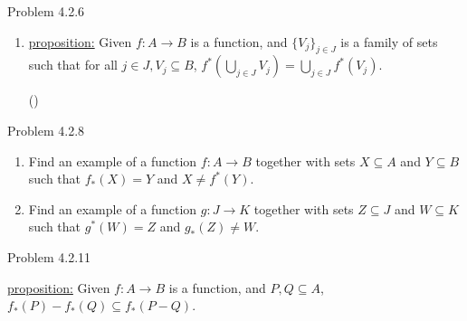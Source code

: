 \documentclass{article}
\theoremstyle{definition}
\begin{document}

	\noindent Problem 4.2.6  \vspace{0.3cm}

	\begin{enumerate}
		\item[viii]
		\underline{proposition:}  Given $f:A\rightarrow B$ is a function,
		and $\{V_j\}_{j\in J}$ is a family of sets such that for all $j\in
		J, V_j\subseteq B$, $f^*\left(\bigcup_{j\in
		J}V_j\right)=\bigcup_{j\in J}f^*(V_j)$.

		\vspace{.2cm}

		 () \vspace{.15cm}

	\end{enumerate}
	\vspace{1cm}



	\noindent Problem 4.2.8 \vspace{0.3cm}


	\begin{enumerate}
		\item[1]   Find an example of a function $f:A\rightarrow B$ together with sets $X\subseteq A$ and $Y\subseteq B$ such that $f_*(X)=Y$ and $X\neq f^*(Y).$

		\vspace{.2cm}

		\vspace{.15cm}

		\item[2]   Find an example of a function $g:J\rightarrow K$ together with sets $Z\subseteq J$ and $W\subseteq K$ such that $g^*(W)=Z$ and $g_*(Z)\neq W.$

		\vspace{.2cm}

		\vspace{.15cm}

	\end{enumerate}




	\vspace{1cm}


	\noindent Problem 4.2.11  \vspace{0.3cm}

	\underline{proposition:}  Given $f:A\rightarrow B$ is a function,
	and $P, Q\subseteq A$, $f_*(P)-f_*(Q)\subseteq f_*(P-Q)$.
\end{document}
